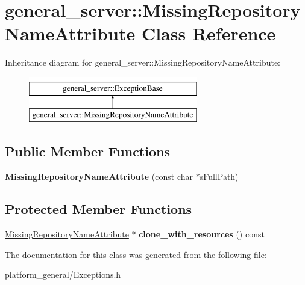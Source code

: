 \hypertarget{classgeneral__server_1_1MissingRepositoryNameAttribute}{\section{general\-\_\-server\-:\-:\-Missing\-Repository\-Name\-Attribute \-Class \-Reference}
\label{classgeneral__server_1_1MissingRepositoryNameAttribute}
}
\-Inheritance diagram for general\-\_\-server\-:\-:\-Missing\-Repository\-Name\-Attribute\-:\begin{figure}[H]
\begin{center}
\leavevmode
\includegraphics[height=2.000000cm]{classgeneral__server_1_1MissingRepositoryNameAttribute}
\end{center}
\end{figure}
\subsection*{\-Public \-Member \-Functions}
\begin{DoxyCompactItemize}
\item 
\hypertarget{classgeneral__server_1_1MissingRepositoryNameAttribute_a4bfa60a083faa7ce76bee026093b9525}{{\bfseries \-Missing\-Repository\-Name\-Attribute} (const char $\ast$s\-Full\-Path)}\label{classgeneral__server_1_1MissingRepositoryNameAttribute_a4bfa60a083faa7ce76bee026093b9525}

\end{DoxyCompactItemize}
\subsection*{\-Protected \-Member \-Functions}
\begin{DoxyCompactItemize}
\item 
\hypertarget{classgeneral__server_1_1MissingRepositoryNameAttribute_afac915946d1ab266920138a18a71cc5e}{\hyperlink{classgeneral__server_1_1MissingRepositoryNameAttribute}{\-Missing\-Repository\-Name\-Attribute} $\ast$ {\bfseries clone\-\_\-with\-\_\-resources} () const }\label{classgeneral__server_1_1MissingRepositoryNameAttribute_afac915946d1ab266920138a18a71cc5e}

\end{DoxyCompactItemize}


\-The documentation for this class was generated from the following file\-:\begin{DoxyCompactItemize}
\item 
platform\-\_\-general/\-Exceptions.\-h\end{DoxyCompactItemize}
